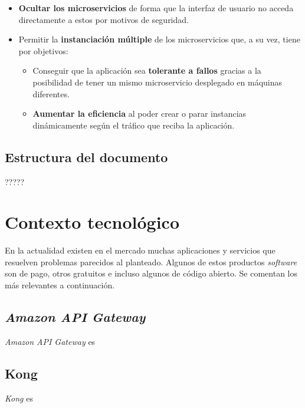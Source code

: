 \documentclass[11pt,spanish,listoffigures]{tfgetsinf}
\begin{document}
\begin{itemize}

	\item \textbf{Ocultar los microservicios} de forma que la interfaz de usuario no acceda directamente a estos por motivos de seguridad.
	
	\item Permitir la \textbf{instanciación múltiple} de los microservicios que, a su vez, tiene por objetivos:
		\begin{itemize}
		
			\item Conseguir que la aplicación sea \textbf{tolerante a fallos} gracias a la posibilidad de tener un mismo microservicio desplegado en máquinas diferentes.
			
			\item \textbf{Aumentar la eficiencia} al poder crear o parar instancias dinámicamente según el tráfico que reciba la aplicación.
			
		\end{itemize}

\end{itemize}

\section{Estructura del documento}

?????


\chapter{Contexto tecnológico}

En la actualidad existen en el mercado muchas aplicaciones y servicios que resuelven problemas parecidos al planteado. Algunos de estos productos \emph{software} son de pago, otros gratuitos e incluso algunos de código abierto. Se comentan los más relevantes a continuación.

\section{\emph{Amazon API Gateway}}
\emph{Amazon API Gateway} \cite{Amazon} es
	
\section{Kong}
\emph{Kong} \cite{Kong} es
	
\end{document}

